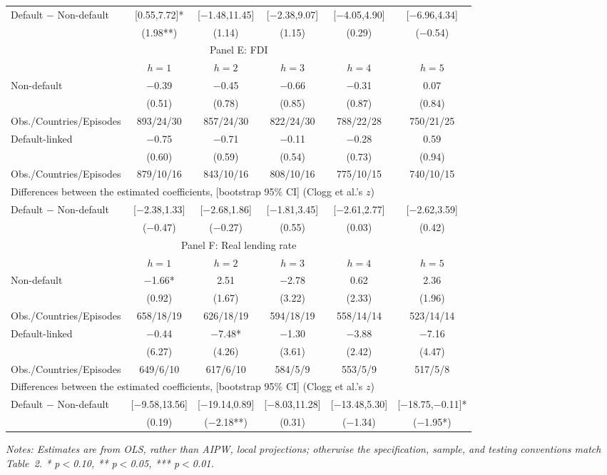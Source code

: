 \documentclass[12pt]{article}
\newcommand{\notes}[1]{\par\begingroup\footnotesize\itshape\justifying\noindent Notes: #1\par\endgroup}
\begin{document}
\begin{longtable}{lccccc}
Default $-$ Non-default & [0.55,7.72]* & [$-$1.48,11.45] & [$-$2.38,9.07] & [$-$4.05,4.90] & [$-$6.96,4.34] \\
 & (1.98**) & (1.14) & (1.15) & (0.29) & ($-$0.54) \\[5pt]
\multicolumn{6}{c}{\large Panel E: FDI} \\
\toprule
 & $h=1$ & $h=2$ & $h=3$ & $h=4$ & $h=5$ \\
\midrule
Non-default & $-$0.39 & $-$0.45 & $-$0.66 & $-$0.31 & 0.07 \\
 & (0.51) & (0.78) & (0.85) & (0.87) & (0.84) \\[1pt]
Obs./Countries/Episodes & 893/24/30 & 857/24/30 & 822/24/30 & 788/22/28 & 750/21/25 \\[3pt]
Default-linked & $-$0.75 & $-$0.71 & $-$0.11 & $-$0.28 & 0.59 \\
 & (0.60) & (0.59) & (0.54) & (0.73) & (0.94) \\[1pt]
Obs./Countries/Episodes & 879/10/16 & 843/10/16 & 808/10/16 & 775/10/15 & 740/10/15 \\[4pt]
\multicolumn{6}{l}{Differences between the estimated coefficients, [bootstrap 95\% CI] (Clogg et al.'s $z$)} \\[2pt]
Default $-$ Non-default & [$-$2.38,1.33] & [$-$2.68,1.86] & [$-$1.81,3.45] & [$-$2.61,2.77] & [$-$2.62,3.59] \\
 & ($-$0.47) & ($-$0.27) & (0.55) & (0.03) & (0.42) \\[5pt]
\multicolumn{6}{c}{\large Panel F: Real lending rate} \\
\toprule
 & $h=1$ & $h=2$ & $h=3$ & $h=4$ & $h=5$ \\
\midrule
Non-default & $-$1.66* & 2.51 & $-$2.78 & 0.62 & 2.36 \\
 & (0.92) & (1.67) & (3.22) & (2.33) & (1.96) \\[1pt]
Obs./Countries/Episodes & 658/18/19 & 626/18/19 & 594/18/19 & 558/14/14 & 523/14/14 \\[3pt]
Default-linked & $-$0.44 & $-$7.48* & $-$1.30 & $-$3.88 & $-$7.16 \\
 & (6.27) & (4.26) & (3.61) & (2.42) & (4.47) \\[1pt]
Obs./Countries/Episodes & 649/6/10 & 617/6/10 & 584/5/9 & 553/5/9 & 517/5/8 \\[4pt]
\multicolumn{6}{l}{Differences between the estimated coefficients, [bootstrap 95\% CI] (Clogg et al.'s $z$)} \\[2pt]
Default $-$ Non-default & [$-$9.58,13.56] & [$-$19.14,0.89] & [$-$8.03,11.28] & [$-$13.48,5.30] & [$-$18.75,$-$0.11]* \\
 & (0.19) & ($-$2.18**) & (0.31) & ($-$1.34) & ($-$1.95*) \\
\end{longtable}
\endgroup
\notes{Estimates are from OLS, rather than AIPW, local projections;
otherwise the specification, sample, and testing conventions match
Table~2. * p$<$0.10, ** p$<$0.05, *** p$<$0.01.}
\end{document}
